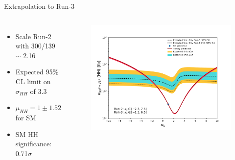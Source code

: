 \begin{frame}{Extrapolation to Run-3}
\begin{columns}
\begin{itemize}
    \item Scale Run-2 with 300/139 $\sim$ 2.16
    \item Expected 95\% CL limit on $\sigma_{HH}$ of 3.3
    \item $\mu_{HH} = 1 \pm 1.52$ for SM
    \item SM HH significance: 0.71$\sigma$ 
\end{itemize}

\begin{figure}
    \centering
    \includegraphics[width=1.\textwidth]{BackUp/Part4/Img/kappa_lambda_Run_3_stat.pdf}
\end{figure}
\end{columns}    
\end{frame}

